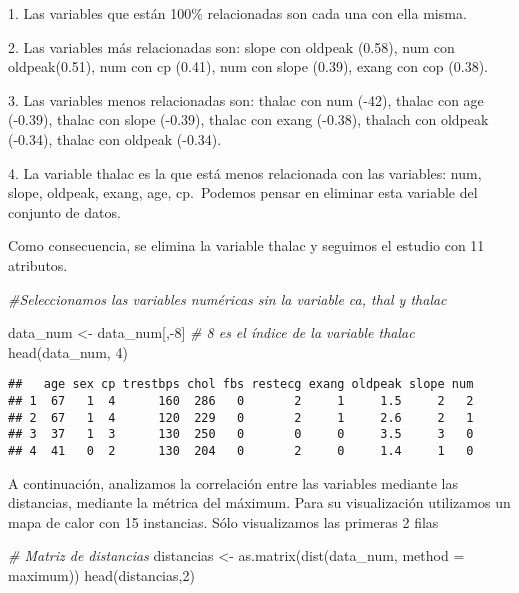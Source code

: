\documentclass[
]{article}
\newenvironment{Shaded}{\begin{snugshade}}{\end{snugshade}}
\newcommand{\AttributeTok}[1]{\textcolor[rgb]{0.77,0.63,0.00}{#1}}
\newcommand{\CommentTok}[1]{\textcolor[rgb]{0.56,0.35,0.01}{\textit{#1}}}
\newcommand{\DecValTok}[1]{\textcolor[rgb]{0.00,0.00,0.81}{#1}}
\newcommand{\FunctionTok}[1]{\textcolor[rgb]{0.00,0.00,0.00}{#1}}
\newcommand{\NormalTok}[1]{#1}
\newcommand{\OtherTok}[1]{\textcolor[rgb]{0.56,0.35,0.01}{#1}}
\newcommand{\SpecialCharTok}[1]{\textcolor[rgb]{0.00,0.00,0.00}{#1}}
\newcommand{\StringTok}[1]{\textcolor[rgb]{0.31,0.60,0.02}{#1}}
\begin{document}
1. Las variables que están 100\% relacionadas son cada una con ella
misma.

2. Las variables más relacionadas son: slope con oldpeak (0.58), num con
oldpeak(0.51), num con cp (0.41), num con slope (0.39), exang con cop
(0.38).

3. Las variables menos relacionadas son: thalac con num (-42), thalac
con age (-0.39), thalac con slope (-0.39), thalac con exang (-0.38),
thalach con oldpeak (-0.34), thalac con oldpeak (-0.34).

4. La variable thalac es la que está menos relacionada con las
variables: num, slope, oldpeak, exang, age, cp.~Podemos pensar en
eliminar esta variable del conjunto de datos.

Como consecuencia, se elimina la variable thalac y seguimos el estudio
con 11 atributos.

\begin{Shaded}
\begin{Highlighting}[]
\CommentTok{\#Seleccionamos las variables numéricas sin la variable ca, thal y thalac}

\NormalTok{data\_num }\OtherTok{\textless{}{-}}\NormalTok{ data\_num[,}\SpecialCharTok{{-}}\DecValTok{8}\NormalTok{] }\CommentTok{\# 8 es el índice de la variable thalac}
\FunctionTok{head}\NormalTok{(data\_num, }\DecValTok{4}\NormalTok{)}
\end{Highlighting}
\end{Shaded}

\begin{verbatim}
##   age sex cp trestbps chol fbs restecg exang oldpeak slope num
## 1  67   1  4      160  286   0       2     1     1.5     2   2
## 2  67   1  4      120  229   0       2     1     2.6     2   1
## 3  37   1  3      130  250   0       0     0     3.5     3   0
## 4  41   0  2      130  204   0       2     0     1.4     1   0
\end{verbatim}

A continuación, analizamos la correlación entre las variables mediante
las distancias, mediante la métrica del máximum. Para su visualización
utilizamos un mapa de calor con 15 instancias. Sólo visualizamos las
primeras 2 filas

\begin{Shaded}
\begin{Highlighting}[]
\CommentTok{\# Matriz de distancias}
\NormalTok{distancias }\OtherTok{\textless{}{-}} \FunctionTok{as.matrix}\NormalTok{(}\FunctionTok{dist}\NormalTok{(data\_num, }\AttributeTok{method =} \StringTok{\textquotesingle{}maximum\textquotesingle{}}\NormalTok{))}
\FunctionTok{head}\NormalTok{(distancias,}\DecValTok{2}\NormalTok{)}
\end{Highlighting}
\end{Shaded}
\end{document}
